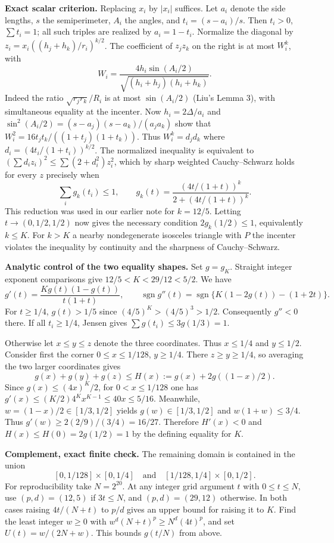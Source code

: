 \documentclass[11pt,a4paper]{article}
\numberwithin{equation}{section}
\theoremstyle{definition}
\theoremstyle{remark}
\begin{document}
\textbf{Exact scalar criterion.} Replacing $x_i$ by $|x_i|$ suffices. Let $a_i$ denote the side lengths, $s$ the semiperimeter, $A_i$ the angles, and $t_i=(s-a_i)/s$. Then $t_i>0$, $\sum t_i=1$; all such triples are realized by $a_i=1-t_i$. Normalize the diagonal by $z_i=x_i((h_j+h_k)/r_i)^{k/2}$. The coefficient of $z_jz_k$ on the right is at most $W_i^k$, with
\[
 W_i=\frac{4h_i\sin(A_i/2)}{\sqrt{(h_i+h_j)(h_i+h_k)}}.
\]
Indeed the ratio $\sqrt{r_jr_k}/R_i$ is at most $\sin(A_i/2)$ (Liu's Lemma 3), with simultaneous equality at the incenter. Now $h_i=2\Delta/a_i$ and $\sin^2(A_i/2)=(s-a_j)(s-a_k)/(a_ja_k)$ show that $W_i^2=16t_jt_k/((1+t_j)(1+t_k))$. Thus $W_i^k=d_jd_k$ where $d_i=(4t_i/(1+t_i))^{k/2}$. The normalized inequality is equivalent to $(\sum d_i z_i)^2\le\sum(2+d_i^2)z_i^2$, which by sharp weighted Cauchy--Schwarz holds for every $z$ precisely when
\[
 \sum_i g_k(t_i)\le1,\qquad
 g_k(t)=\frac{(4t/(1+t))^k}{2+(4t/(1+t))^k}.
\]
This reduction was used in our earlier note for $k=12/5$. Letting $t\to(0,1/2,1/2)$ now gives the necessary condition $2g_k(1/2)\le1$, equivalently $k\le K$. For $k>K$ a nearby nondegenerate isosceles triangle with $P$ the incenter violates the inequality by continuity and the sharpness of Cauchy--Schwarz.

\textbf{Analytic control of the two equality shapes.} Set $g=g_K$. Straight integer exponent comparisons give $12/5<K<29/12<5/2$. We have
\[
 g'(t)=\frac{K g(t)(1-g(t))}{t(1+t)},\qquad
 \operatorname{sgn}g''(t)=\operatorname{sgn}\{K(1-2g(t))-(1+2t)\}.
\]
For $t\ge1/4$, $g(t)>1/5$ since $(4/5)^K>(4/5)^3>1/2$. Consequently $g''<0$ there. If all $t_i\ge1/4$, Jensen gives $\sum g(t_i)\le3g(1/3)=1$.

Otherwise let $x\le y\le z$ denote the three coordinates. Thus $x\le1/4$ and $y\le1/2$. Consider first the corner $0\le x\le1/128$, $y\ge1/4$. There $z\ge y\ge1/4$, so averaging the two larger coordinates gives
\[
 g(x)+g(y)+g(z)\le H(x):=g(x)+2g((1-x)/2).
\]
Since $g(x)\le (4x)^K/2$, for $0<x\le1/128$ one has $g'(x)\le (K/2)4^K x^{K-1}\le40x\le5/16$. Meanwhile, $w=(1-x)/2\in[1/3,1/2]$ yields $g(w)\in[1/3,1/2]$ and $w(1+w)\le3/4$. Thus $g'(w)\ge2(2/9)/(3/4)=16/27$. Therefore $H'(x)<0$ and $H(x)\le H(0)=2g(1/2)=1$ by the defining equality for $K$.

\textbf{Complement, exact finite check.} The remaining domain is contained in the union
\[
 [0,1/128]\times[0,1/4]\quad\text{and}\quad
 [1/128,1/4]\times[0,1/2].
\]
For reproducibility take $N=2^{20}$. At any integer grid argument $t$ with $0\le t\le N$, use $(p,d)=(12,5)$ if $3t\le N$, and $(p,d)=(29,12)$ otherwise. In both cases raising $4t/(N+t)$ to $p/d$ gives an upper bound for raising it to $K$. Find the least integer $w\ge0$ with $w^d(N+t)^p\ge N^d(4t)^p$, and set $U(t)=w/(2N+w)$. This bounds $g(t/N)$ from above.
\end{document}

